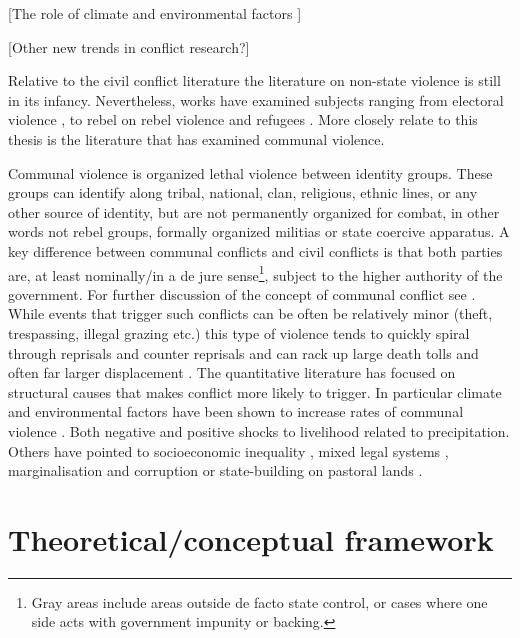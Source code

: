 \documentclass[12pt]{article}
\begin{document}
[The role of climate and environmental factors \citep{Detges_2017,
von_Uexkull_2021}]

[Other new trends in conflict research?]

Relative to the civil conflict literature the literature on non-state violence
is still in its infancy. Nevertheless, works have examined subjects ranging from
electoral violence \citep{Fjelde_2020, Salehyan_2014, Burchard_2015}, to rebel
on rebel violence \citep{Fjelde_2012, Lilja_2011, Cunningham_2012, Nygard_2014}
and refugees \citep{Bohmelt_2018}. More closely relate to this thesis is the
literature that has examined communal violence.

 Communal violence is organized lethal violence between identity groups. These
 groups can identify along tribal, national, clan, religious, ethnic lines, or
 any other source of identity, but are not permanently organized for combat, in
 other words not rebel groups, formally organized militias or state coercive
 apparatus. A key difference between communal conflicts and civil conflicts is
 that both parties are, at least nominally/in a de jure sense\footnote{Gray
	 areas include areas outside de facto state control, or cases where one
 side acts with government impunity or backing.}, subject to the higher
 authority of the government. For further discussion of the concept of communal
 conflict see \citet{BroscheJohan2012Cccw}. While events that trigger such
 conflicts can be often be relatively minor (theft, trespassing, illegal
 grazing etc.) this type of violence tends to quickly spiral through reprisals
 and counter reprisals and can rack up large death tolls and often far larger
 displacement \citep{Horowitz_2001}. The quantitative literature has focused on
 structural causes that makes conflict more likely to trigger. In particular
 climate and environmental factors have been shown to increase rates of
communal violence \citep{Turner_2011}. Both negative \citep{Detges_2017,
Fjelde2012, van_Weezel_2019, Petrova_2022} and positive \citep{Theisen2012,
Witsenburg2012} shocks to livelihood related to precipitation. Others have
pointed to socioeconomic inequality \citep{Fjelde2014, PETERS_2004}, mixed legal
systems \citep{Eck2014}, marginalisation and corruption \citep{BENJAMINSEN_2009}
or state-building on pastoral lands \citep{hagmann2008pastoral}.

\section{Theoretical/conceptual framework}
\label{Theoretical/conceptual framework}
\end{document}
